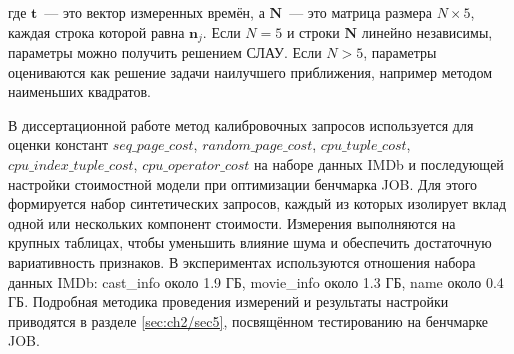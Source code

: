 где \(\mathbf{t}\)~--- это вектор измеренных времён, а \(\mathbf{N}\)~--- это матрица размера \(N \times 5\), каждая строка которой равна \(\mathbf{n}_j\). Если \(N = 5\) и строки \(\mathbf{N}\) линейно независимы, параметры можно получить решением СЛАУ. Если \(N > 5\), параметры оцениваются как решение задачи наилучшего приближения, например методом наименьших квадратов.

В диссертационной работе метод калибровочных запросов используется для оценки констант \(seq\_page\_cost\), \(random\_page\_cost\), \(cpu\_tuple\_cost\), \(cpu\_index\_tuple\_cost\), \(cpu\_operator\_cost\) на наборе данных IMDb и последующей настройки стоимостной модели при оптимизации бенчмарка JOB. Для этого формируется набор синтетических запросов, каждый из которых изолирует вклад одной или нескольких компонент стоимости. Измерения выполняются на крупных таблицах, чтобы уменьшить влияние шума и обеспечить достаточную вариативность признаков. В экспериментах используются отношения набора данных IMDb: cast\_info около 1.9 ГБ, movie\_info около 1.3 ГБ, name около 0.4 ГБ. Подробная методика проведения измерений и результаты настройки приводятся в разделе \ref{sec:ch2/sec5}, посвящённом тестированию на бенчмарке JOB.

